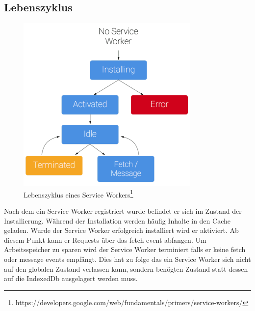 \subsection{Lebenszyklus}
\begin{figure}[!h]
	\centering
	\includegraphics[width=0.8\textwidth]{figures/sw-lifecycle}
	\caption[A Figure Short-Title]{Lebenszyklus eines Service Workers\footnote{https://developers.google.com/web/fundamentals/primers/service-workers/}}
	\label{fig:swLifecycle}
\end{figure}
Nach dem ein Service Worker registriert wurde befindet er sich im Zustand der Installierung. Während der Installation werden häufig Inhalte in den Cache geladen. Wurde der Service Worker erfolgreich installiert wird er aktiviert. Ab diesem Punkt kann er Requests über das fetch event abfangen. Um Arbeitsspeicher zu sparen wird der Service Worker terminiert falls er keine fetch oder message events empfängt. Dies hat zu folge das ein Service Worker sich nicht auf den globalen Zustand verlassen kann, sondern benögten Zustand statt dessen auf die IndexedDb ausgelagert werden muss.  



%


